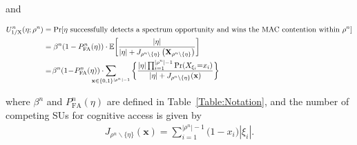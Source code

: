 \documentclass[journal,draftclsnofoot,onecolumn]{IEEEtran}
\theoremstyle{definition}
\newif\ifdoublecolumn
\begin{document}
\fi
and
\ifdoublecolumn
\begin{align}\label{Eq:CoalValue1X}
&U_\mathrm{1/X}^n(\eta ;\rho^n )=\Pr[\text{$\eta$ successfully detects a spectrum}\notag\\
&\text{ opportunity and wins the MAC contention within $\rho^n$}]\notag\\
&=\beta ^n(1-P_\mathrm{FA}^n(\eta ))\cdot\mathbb{E}\bigg[\frac{|\eta|}{|\eta|+J_{\rho^n\backslash\{\eta\}}\left(\mathbf{X}_{\rho^n\backslash\{\eta\}}\right)}\bigg]\\
&=\!\beta ^n(1\!-\!P_\mathrm{FA}^n(\eta ))\cdot\smashoperator[l]{\sum_{\mathbf{x}{\in}\{0,1\}^{|\rho^n|-1}}}\bigg\{\frac{|\eta|\prod \nolimits_{i=1}^{|\rho^n|-1}\Pr(X_{\xi_i}{=}x_i)}{|\eta|+J_{\rho^n\backslash\{\eta\}}(\mathbf{x})}\bigg\}\notag
\end{align}
\else
\begin{align}\label{Eq:CoalValue1X}
U_\mathrm{1/X}^n(\eta ;\rho^n )& =\Pr[\text{$\eta$ successfully detects a spectrum opportunity and wins the MAC contention within $\rho^n$}]\notag\\
&=\beta ^n(1-P_\mathrm{FA}^n(\eta ))\cdot\mathbb{E}\bigg[\frac{|\eta|}{|\eta|+J_{\rho^n\backslash\{\eta\}}\left(\mathbf{X}_{\rho^n\backslash\{\eta\}}\right)}\bigg]\notag\\
&=\!\beta ^n(1\!-\!P_\mathrm{FA}^n(\eta ))\cdot\smashoperator[l]{\sum_{\mathbf{x}{\in}\{0,1\}^{|\rho^n|-1}}}\bigg\{\frac{|\eta|\prod \nolimits_{i=1}^{|\rho^n|-1}\Pr(X_{\xi_i}{=}x_i)}{|\eta|+J_{\rho^n\backslash\{\eta\}}(\mathbf{x})}\bigg\}
\end{align}
\fi
where $\beta^n$ and $P_\mathrm{FA}^n(\eta)$ are defined in Table~\ref{Table:Notation}, and the number of competing SUs for cognitive access is given by
\begin{equation}\label{Eq:J}
\begin{split}
J_{\rho^n\backslash\{\eta\}}(\mathbf{x})={\sum\nolimits_{i = 1}^{|\rho^n | - 1}} ( {1 - x_i)|{\xi _i}|}. 
\end{split}
\end{equation}
\end{document}
